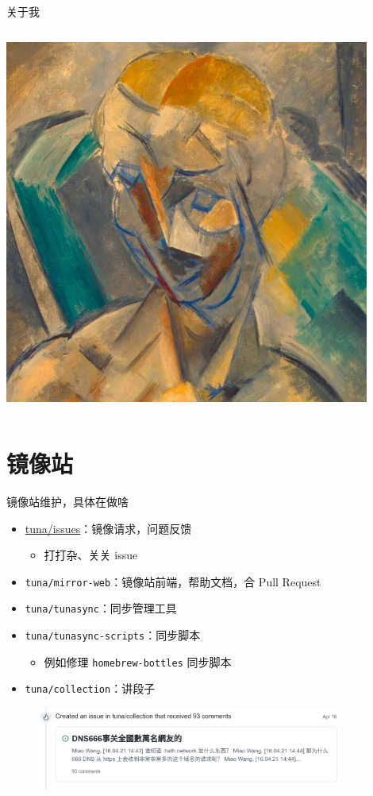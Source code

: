 \documentclass{ctexbeamer}
\newcommand{\T}[1]{\texttt{#1}}
\begin{document}
\begin{frame}{关于我}
\begin{columns}
\begin{column}{0.35\textwidth}
      \includegraphics[width=0.9\textwidth]{img/miku.jpg}
    \end{column}
  \end{columns}
\end{frame}

\section{镜像站}
\begin{frame}{镜像站维护，具体在做啥}
  \begin{itemize}
    \item \url{tuna/issues}：镜像请求，问题反馈\begin{itemize}
      \item 打打杂、关关 issue
    \end{itemize}
    \item \T{tuna/mirror-web}：镜像站前端，帮助文档，合 Pull Request
    \item \T{tuna/tunasync}：同步管理工具
    \item \T{tuna/tunasync-scripts}：同步脚本\begin{itemize}
      \item 例如修理 \T{homebrew-bottles} 同步脚本
    \end{itemize}
    \item \T{tuna/collection}：讲段子
  \end{itemize}
  \begin{figure}
    \centering
    \includegraphics[width=0.9\textwidth]{img/666.png}
  \end{figure}
\end{frame}
\end{document}

